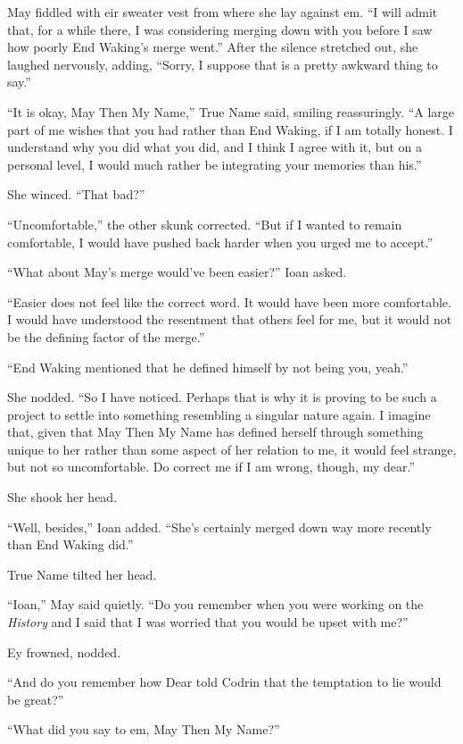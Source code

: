 May fiddled with eir sweater vest from where she lay against em. ``I will admit that, for a while there, I was considering merging down with you before I saw how poorly End Waking's merge went.'' After the silence stretched out, she laughed nervously, adding, ``Sorry, I suppose that is a pretty awkward thing to say.''

``It is okay, May Then My Name,'' True Name said, smiling reassuringly. ``A large part of me wishes that you had rather than End Waking, if I am totally honest. I understand why you did what you did, and I think I agree with it, but on a personal level, I would much rather be integrating your memories than his.''

She winced. ``That bad?''

``Uncomfortable,'' the other skunk corrected. ``But if I wanted to remain comfortable, I would have pushed back harder when you urged me to accept.''

``What about May's merge would've been easier?'' Ioan asked.

``Easier does not feel like the correct word. It would have been more comfortable. I would have understood the resentment that others feel for me, but it would not be the defining factor of the merge.''

``End Waking mentioned that he defined himself by not being you, yeah.''

She nodded. ``So I have noticed. Perhaps that is why it is proving to be such a project to settle into something resembling a singular nature again. I imagine that, given that May Then My Name has defined herself through something unique to her rather than some aspect of her relation to me, it would feel strange, but not so uncomfortable. Do correct me if I am wrong, though, my dear.''

She shook her head.

``Well, besides,'' Ioan added. ``She's certainly merged down way more recently than End Waking did.''

True Name tilted her head.

``Ioan,'' May said quietly. ``Do you remember when you were working on the \emph{History} and I said that I was worried that you would be upset with me?''

Ey frowned, nodded.

``And do you remember how Dear told Codrin that the temptation to lie would be great?''

``What did you say to em, May Then My Name?''

